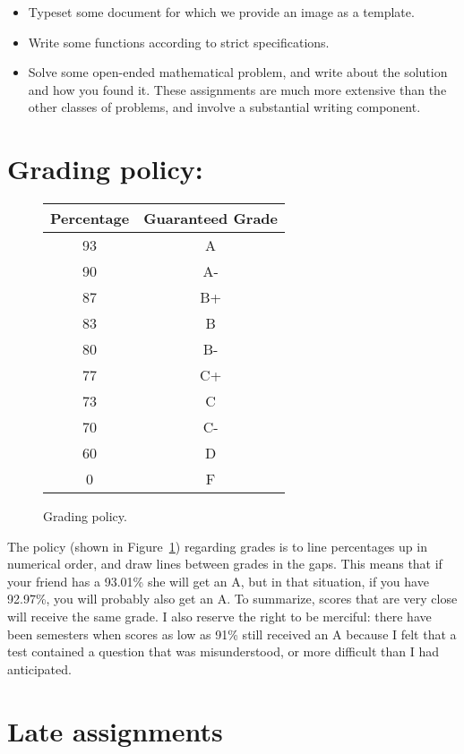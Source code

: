 \documentclass[12pt]{article}
\begin{document}
\begin{itemize}
\item Typeset some document for which we provide an image as a template.

\item Write some functions according to strict specifications.

\item Solve some open-ended mathematical problem, and write about the
solution and how you found it.  These assignments are much more
extensive than the other classes of problems, and involve a
substantial writing component.
\end{itemize}

\section*{Grading policy:}

\begin{figure}[h!]
\centering
\begin{tabular}{|c|c|} \hline
Percentage & Guaranteed Grade \\ \hline
93 &	A \\
90 &	A- \\
87 &	B+ \\
83 &	B \\
80 &	B- \\
77 &	C+ \\ 
73 &	C \\
70 &	C- \\
60 &	D \\
0 &	F \\ \hline
\end{tabular}
\caption{Grading policy.}
\label{fig:grading}
\end{figure}


The policy (shown in Figure~\ref{fig:grading}) regarding grades is to line percentages up in numerical
order, and draw lines between grades in the gaps. This means that if
your friend has a 93.01\% she will get an A, but in that situation, if
you have 92.97\%, you will probably also get an A. To summarize, scores
that are very close will receive the same grade. I also reserve the
right to be merciful: there have been semesters when scores as low as
91\% still received an A because I felt that a test contained a
question that was misunderstood, or more difficult than I had
anticipated.

\section*{Late assignments}
\end{document}
